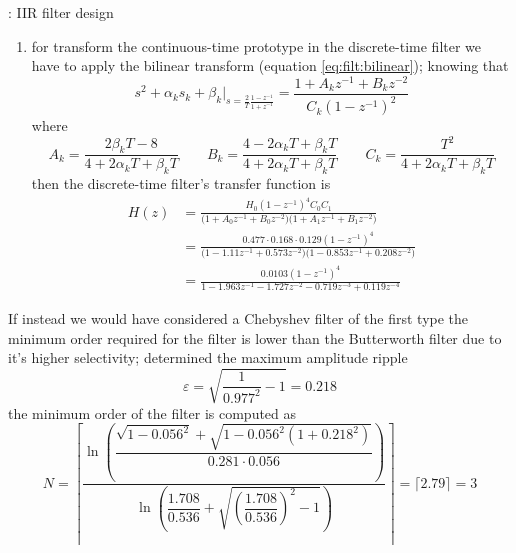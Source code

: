 \begin{example}{: IIR filter design}
\begin{enumerate}
				\item for transform the continuous-time prototype in the discrete-time filter we have to apply the bilinear transform (equation \ref{eq:filt:bilinear}); knowing that
				\[ s^2 + \alpha_k s_k +\beta_k\Big|_{s=\frac 2 T\frac{1-z^{-1}}{1+z^{-1}}} = \frac{1 + A_kz^{-1} + B_k z^{-2}}{C_k(1-z^{-1})^2} \]
				where
				\[ A_k = \frac{2\beta_kT  - 8}{4+2\alpha_kT + \beta_kT} \qquad  B_k = \frac{4 - 2\alpha_k T + \beta_k T}{4+2\alpha_kT + \beta_kT} \qquad C_k = \frac{T^2}{4+2\alpha_kT + \beta_kT} \]
				then the discrete-time filter's transfer function is
				\begin{align*}
					H(z) & = \frac{H_0(1-z^{-1})^4 C_0C_1}{\big(1 + A_0z^{-1} + B_0z^{-2}\big) \big(1 + A_1z^{-1} + B_1z^{-2}\big) } \\
					& = \frac{0.477 \cdot 0.168 \cdot 0.129 (1-z^{-1})^4}{\big(1 - 1.11z^{-1} + 0.573z^{-2}\big) \big(1 - 0.853z^{-1} + 0.208z^{-2}\big) }\\
					& = \frac{ 0.0103 (1-z^{-1})^4 }{ 1 - 1.963z^{-1} - 1.727 z^{-2} - 0.719 z^{-3} +0.119 z^{-4}  }
				\end{align*}
			\end{enumerate}
			If instead we would have considered a Chebyshev filter of the first type the minimum order required for the filter is lower than the Butterworth filter due to it's higher selectivity; determined the maximum amplitude ripple
			\[ \varepsilon = \sqrt{\frac{1}{0.977^2}-1} = 0.218 \]
			the minimum order of the filter is computed as
			\[ N = \left\lceil \frac{ \ln\left( \dfrac{\sqrt{1-0.056^2} + \sqrt{1-0.056^2(1+0.218^2)} }{0.281\cdot 0.056} \right) }{\ln \left( \dfrac{1.708}{0.536} + \sqrt{\left( \dfrac{1.708}{0.536} \right)^2-1} \right)} \right\rceil = \big\lceil 2.79 \big\rceil = 3 \]
			
		\end{example}
	
	
	